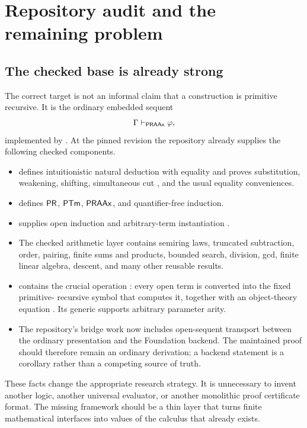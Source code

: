 \section{Repository audit and the remaining problem}
\label{sec:audit}

\subsection{The checked base is already strong}

The correct target is not an informal claim that a construction is primitive
recursive.  It is the ordinary embedded sequent
\[
   \Gamma \mathrel{\vdash_{\mathsf{PRAAx}}} \varphi,
\]
implemented by .  At the pinned revision the repository
already supplies the following checked components.

\begin{itemize}
\item {} defines intuitionistic
  natural deduction with equality and proves substitution, weakening, shifting,
  simultaneous cut , and the usual equality conveniences.
\item {} defines \(\mathsf{PR}\), \(\mathsf{PTm}\),
  \(\mathsf{PRAAx}\), and quantifier-free induction.
\item {} supplies open
  induction  and arbitrary-term instantiation .
\item The checked arithmetic layer contains semiring laws, truncated
  subtraction, order, pairing, finite sums and products, bounded search,
  division, gcd, finite linear algebra, descent, and many other reusable
  results.
\item {} contains the crucial operation
  : every open term is converted into the fixed primitive-
  recursive symbol that computes it, together with an object-theory equation
  .  Its generic  supports arbitrary parameter
  arity.
\item The repository's bridge work now includes open-sequent transport between
  the ordinary presentation and the Foundation backend.  The maintained proof
  should therefore remain an ordinary  derivation; a backend
  statement is a corollary rather than a competing source of truth.
\end{itemize}

These facts change the appropriate research strategy.  It is unnecessary to
invent another logic, another universal evaluator, or another monolithic proof
certificate format.  The missing framework should be a thin layer that turns
finite mathematical interfaces into values of the calculus that already
exists.


